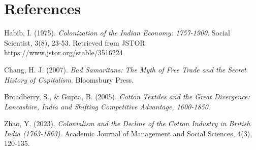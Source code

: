 \documentclass[9pt,twocolumn,twoside]{opticajnl}
\begin{document}
\section{References}
\begin{thebibliography}{9}
Habib, I. (1975). \textit{Colonization of the Indian Economy: 1757-1900}. Social Scientist, 3(8), 23-53. Retrieved from JSTOR: https://www.jstor.org/stable/3516224

Chang, H. J. (2007). \textit{Bad Samaritans: The Myth of Free Trade and the Secret History of Capitalism}. Bloomsbury Press.

Broadberry, S., \& Gupta, B. (2005). \textit{Cotton Textiles and the Great Divergence: Lancashire, India and Shifting Competitive Advantage, 1600-1850}. 

Zhao, Y. (2023). \textit{Colonialism and the Decline of the Cotton Industry in British India (1763-1863)}. Academic Journal of Management and Social Sciences, 4(3), 120-135.
\end{thebibliography}
\end{document}
